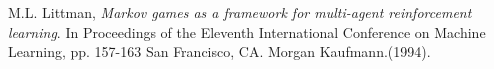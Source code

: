\newpage
\nocite{*}


\begin{thebibliography}{9}

  M.L. Littman,
  \emph{Markov games as a framework for multi-agent reinforcement learning}. In Proceedings of the Eleventh International Conference on Machine Learning, pp. 157-163 San Francisco, CA. Morgan Kaufmann.(1994).
  
\end{thebibliography}
